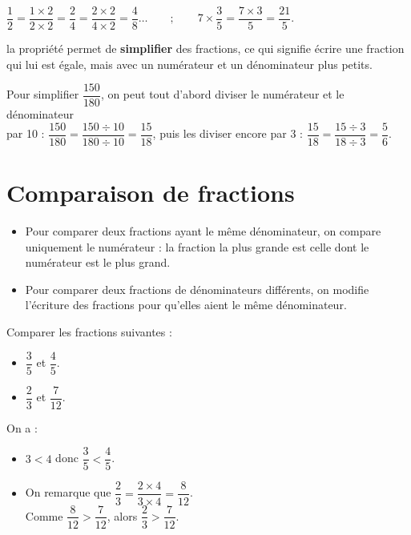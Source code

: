 \begin{exemple*1}   
   $\dfrac12 =\dfrac{1\times2}{2\times2} =\dfrac24 =\dfrac{2\times2}{4\times2} = \dfrac48\dots \qquad ; \qquad 7\times\dfrac{3}{5} =\dfrac{7\times3}{5} =\dfrac{21}{5}$.
\end{exemple*1}

\begin{remarque}
   la propriété permet de {\bf simplifier} des fractions, ce qui  signifie écrire une fraction qui lui est égale, mais avec un numérateur et un dénominateur plus petits.
\end{remarque}

\begin{exemple*1}
   Pour simplifier $\dfrac{150}{180}$, on peut tout d'abord diviser le numérateur et le dénominateur \\ [1mm]
      par 10 : $\dfrac{150}{180} =\dfrac{150\div10}{180\div10} =\dfrac{15}{18}$, puis les diviser encore par 3 : $\dfrac{15}{18} =\dfrac{15\div3}{18\div3} =\dfrac56$.
\end{exemple*1}


\section{Comparaison de fractions} %

\begin{propriete}
   \begin{itemize}
      \item Pour comparer deux fractions ayant le même dénominateur, on compare uniquement le numérateur : la fraction la plus grande est celle dont le numérateur est le plus grand.
      \item Pour comparer deux fractions de dénominateurs différents, on modifie l'écriture des fractions pour qu'elles aient le même dénominateur. \\ [-8mm]
   \end{itemize}
\end{propriete}

\begin{exemple}
   Comparer les fractions suivantes : \smallskip
   \begin{itemize}
      \item $\dfrac35$ et $\dfrac45$. \medskip
      \item $\dfrac23$ et $\dfrac{7}{12}$.
   \end{itemize}
   \correction
   On a :
   \begin{itemize}
      \item $3<4$ donc $\dfrac35<\dfrac45$. \smallskip
      \item On remarque que $\dfrac23=\dfrac{2\times4}{3\times4}=\dfrac{8}{12}$. \\ [1mm]
      Comme $\dfrac{8}{12}>\dfrac{7}{12}$, alors $\dfrac23>\dfrac{7}{12}$.
   \end{itemize}
\end{exemple}


